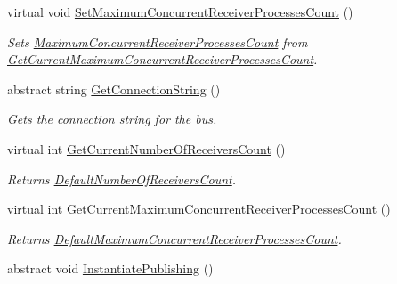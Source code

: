\begin{DoxyCompactItemize}
virtual void \hyperlink{classCqrs_1_1Azure_1_1ServiceBus_1_1AzureBus_a60cbe46aa3e60528dbd7e07be5132132_a60cbe46aa3e60528dbd7e07be5132132}{Set\+Maximum\+Concurrent\+Receiver\+Processes\+Count} ()
\begin{DoxyCompactList}\small\item\em Sets \hyperlink{classCqrs_1_1Azure_1_1ServiceBus_1_1AzureBus_a6b517888d91c6a5b026cb5857e75a04f_a6b517888d91c6a5b026cb5857e75a04f}{Maximum\+Concurrent\+Receiver\+Processes\+Count} from \hyperlink{classCqrs_1_1Azure_1_1ServiceBus_1_1AzureBus_adfed2926ff68eff521e8c64c02cca2a6_adfed2926ff68eff521e8c64c02cca2a6}{Get\+Current\+Maximum\+Concurrent\+Receiver\+Processes\+Count}. \end{DoxyCompactList}\item 
abstract string \hyperlink{classCqrs_1_1Azure_1_1ServiceBus_1_1AzureBus_a514e371d5ce093678365af31e6c274e3_a514e371d5ce093678365af31e6c274e3}{Get\+Connection\+String} ()
\begin{DoxyCompactList}\small\item\em Gets the connection string for the bus. \end{DoxyCompactList}\item 
virtual int \hyperlink{classCqrs_1_1Azure_1_1ServiceBus_1_1AzureBus_a8489f49aa20b972411e12465baa1bd14_a8489f49aa20b972411e12465baa1bd14}{Get\+Current\+Number\+Of\+Receivers\+Count} ()
\begin{DoxyCompactList}\small\item\em Returns \hyperlink{classCqrs_1_1Azure_1_1ServiceBus_1_1AzureBus_a19642a14d6cf036cbbdb68b9ba7e635d_a19642a14d6cf036cbbdb68b9ba7e635d}{Default\+Number\+Of\+Receivers\+Count}. \end{DoxyCompactList}\item 
virtual int \hyperlink{classCqrs_1_1Azure_1_1ServiceBus_1_1AzureBus_adfed2926ff68eff521e8c64c02cca2a6_adfed2926ff68eff521e8c64c02cca2a6}{Get\+Current\+Maximum\+Concurrent\+Receiver\+Processes\+Count} ()
\begin{DoxyCompactList}\small\item\em Returns \hyperlink{classCqrs_1_1Azure_1_1ServiceBus_1_1AzureBus_a12c3d07b7ad1836e85a449e6adc8b5df_a12c3d07b7ad1836e85a449e6adc8b5df}{Default\+Maximum\+Concurrent\+Receiver\+Processes\+Count}. \end{DoxyCompactList}\item 
abstract void \hyperlink{classCqrs_1_1Azure_1_1ServiceBus_1_1AzureBus_a0bacaa4619921333da4a27371c1d6d0a_a0bacaa4619921333da4a27371c1d6d0a}{Instantiate\+Publishing} ()

\end{DoxyCompactItemize}
